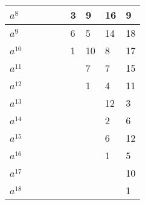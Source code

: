 \documentclass{article}
\begin{document}
\begin{table}[h]
\begin{tabular}{lllllllll}
\multicolumn{1}{|l|}{$a^8$} & \multicolumn{1}{l|}{} & \multicolumn{1}{l|}{} & \multicolumn{1}{l|}{} & \multicolumn{1}{l|}{} & \multicolumn{1}{l|}{3} & \multicolumn{1}{l|}{9} & \multicolumn{1}{l|}{16} & \multicolumn{1}{l|}{9} \\ \hline
\multicolumn{1}{|l|}{$a^9$} & \multicolumn{1}{l|}{} & \multicolumn{1}{l|}{} & \multicolumn{1}{l|}{} & \multicolumn{1}{l|}{} & \multicolumn{1}{l|}{6} & \multicolumn{1}{l|}{5} & \multicolumn{1}{l|}{14} & \multicolumn{1}{l|}{18} \\ \hline
\multicolumn{1}{|l|}{$a^{10}$} & \multicolumn{1}{l|}{} & \multicolumn{1}{l|}{} & \multicolumn{1}{l|}{} & \multicolumn{1}{l|}{} & \multicolumn{1}{l|}{1} & \multicolumn{1}{l|}{10} & \multicolumn{1}{l|}{8} & \multicolumn{1}{l|}{17} \\ \hline
\multicolumn{1}{|l|}{$a^{11}$} & \multicolumn{1}{l|}{} & \multicolumn{1}{l|}{} & \multicolumn{1}{l|}{} & \multicolumn{1}{l|}{} & \multicolumn{1}{l|}{} & \multicolumn{1}{l|}{7} & \multicolumn{1}{l|}{7} & \multicolumn{1}{l|}{15} \\ \hline
\multicolumn{1}{|l|}{$a^{12}$} & \multicolumn{1}{l|}{} & \multicolumn{1}{l|}{} & \multicolumn{1}{l|}{} & \multicolumn{1}{l|}{} & \multicolumn{1}{l|}{} & \multicolumn{1}{l|}{1} & \multicolumn{1}{l|}{4} & \multicolumn{1}{l|}{11} \\ \hline
\multicolumn{1}{|l|}{$a^{13}$} & \multicolumn{1}{l|}{} & \multicolumn{1}{l|}{} & \multicolumn{1}{l|}{} & \multicolumn{1}{l|}{} & \multicolumn{1}{l|}{} & \multicolumn{1}{l|}{} & \multicolumn{1}{l|}{12} & \multicolumn{1}{l|}{3} \\ \hline
\multicolumn{1}{|l|}{$a^{14}$} & \multicolumn{1}{l|}{} & \multicolumn{1}{l|}{} & \multicolumn{1}{l|}{} & \multicolumn{1}{l|}{} & \multicolumn{1}{l|}{} & \multicolumn{1}{l|}{} & \multicolumn{1}{l|}{2} & \multicolumn{1}{l|}{6} \\ \hline
\multicolumn{1}{|l|}{$a^{15}$} & \multicolumn{1}{l|}{} & \multicolumn{1}{l|}{} & \multicolumn{1}{l|}{} & \multicolumn{1}{l|}{} & \multicolumn{1}{l|}{} & \multicolumn{1}{l|}{} & \multicolumn{1}{l|}{6} & \multicolumn{1}{l|}{12} \\ \hline
\multicolumn{1}{|l|}{$a^{16}$} & \multicolumn{1}{l|}{} & \multicolumn{1}{l|}{} & \multicolumn{1}{l|}{} & \multicolumn{1}{l|}{} & \multicolumn{1}{l|}{} & \multicolumn{1}{l|}{} & \multicolumn{1}{l|}{1} & \multicolumn{1}{l|}{5} \\ \hline
\multicolumn{1}{|l|}{$a^{17}$} & \multicolumn{1}{l|}{} & \multicolumn{1}{l|}{} & \multicolumn{1}{l|}{} & \multicolumn{1}{l|}{} & \multicolumn{1}{l|}{} & \multicolumn{1}{l|}{} & \multicolumn{1}{l|}{} & \multicolumn{1}{l|}{10} \\ \hline
\multicolumn{1}{|l|}{$a^{18}$} & \multicolumn{1}{l|}{} & \multicolumn{1}{l|}{} & \multicolumn{1}{l|}{} & \multicolumn{1}{l|}{} & \multicolumn{1}{l|}{} & \multicolumn{1}{l|}{} & \multicolumn{1}{l|}{} & \multicolumn{1}{l|}{1} \\ \hline
\end{tabular}
\end{table}
\end{document}
